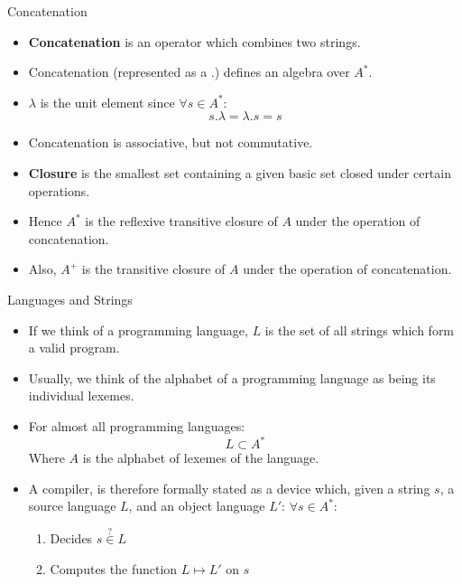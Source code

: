 \documentclass{beamer}
\begin{document}
\begin{frame}{Concatenation}
\begin{itemize}[<+->]
    \item {\bf Concatenation} is an operator which combines two strings.
    \item Concatenation (represented as a $.$) defines an algebra over
        $A^*$.
    \item $\lambda$ is the unit element since $\forall s \in A^*$:
        \[
            s . \lambda = \lambda . s = s
        \]
    \item Concatenation is associative, but not commutative.
    \item {\bf Closure} is the smallest set containing a given basic
        set closed under certain operations.
    \item Hence $A^*$ is the reflexive transitive closure of $A$ under
        the operation of concatenation.
    \item Also, $A^+$ is the transitive closure of $A$ under the 
        operation of concatenation.
\end{itemize}
\end{frame}

\begin{frame}{Languages and Strings}
\begin{itemize}[<+->]
    \item If we think of a programming language, $L$ is the set of all
        strings which form a valid program.
    \item Usually, we think of the alphabet of a programming
        language as being its individual lexemes.
    \item For almost all programming languages:
        \[
            L \subset A^*
        \]
        Where $A$ is the alphabet of lexemes of the language.
    \item A compiler, is therefore formally stated as a device which,
    given a string $s$, a source language $L$, and an object language
    $L'$:
    \newline $\forall s\in A^*$:
    \begin{enumerate}
        \item Decides $s \stackrel{?}{\in} L$
        \item Computes the function $L \mapsto L'$ on $s$
    \end{enumerate}
\end{itemize}
\end{frame}
\end{document}
